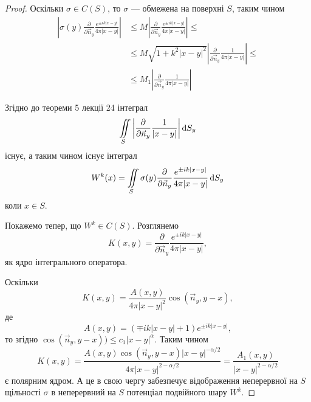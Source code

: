 \begin{proof}
	Оскільки $\sigma \in C(S)$, то $\sigma$ --- обмежена на поверхні $S$, таким чином
	\begin{equation}
		\begin{aligned}
			\left| \sigma(y) \frac{\partial}{\partial \vec n_y} \frac{e^{\pm i k |x - y|}}{4 \pi |x - y|} \right| &\le M \left| \frac{\partial}{\partial \vec n_y} \frac{e^{\pm i k |x - y|}}{4 \pi |x - y|} \right| \le \\
			&\le M \sqrt{1 + k^2 |x - y|^2} \left| \frac{\partial}{\partial \vec n_y} \frac{1}{4 \pi |x - y|} \right| \le \\
			&\le M_1 \left| \frac{\partial}{\partial \vec n_y} \frac{1}{4 \pi |x - y|} \right|
		\end{aligned}
	\end{equation}

	Згідно до теореми 5 лекції 24 інтеграл
	\begin{equation}
		\displaystyle\iint\limits_S \left| \frac{\partial}{\partial \vec n_y} \frac{1}{|x - y|} \right| \mathop{}\!\mathrm{d} S_y
	\end{equation}
	існує, а таким чином існує інтеграл
	\begin{equation}
		W^k(x) = \displaystyle\iint\limits_S \sigma(y) \frac{\partial}{\partial \vec n_y} \frac{e^{\pm i k |x - y|}}{4 \pi |x - y|} \mathop{}\!\mathrm{d} S_y
	\end{equation}
	коли $x \in S$. \medskip

	Покажемо тепер, що $W^k \in C(S)$. Розглянемо
	\begin{equation}
		K(x, y) = \frac{\partial}{\partial \vec n_y} \frac{e^{\pm i k |x - y|}}{4 \pi |x - y|},
	\end{equation}
	як ядро інтегрального оператора. \medskip
	
	Оскільки
	\begin{equation}
		K(x, y) = \frac{A(x, y)}{4 \pi |x - y|^2} \cos(\vec n_y, y - x),
	\end{equation}
	де
	\begin{equation}
		A(x, y) = (\mp i k |x - y| + 1) e^{\pm i k |x - y|},
	\end{equation}
	то згідно  $\cos(\vec n_y, y - x)) \le c_1 |x - y|^\alpha$. Таким чином
	\begin{equation}
		K(x, y) = \frac{A(x, y) \cos(\vec n_y, y - x) |x - y|^{-\alpha/2}}{4 \pi |x - y|^{2-\alpha/2}} = \frac{A_1(x, y)}{|x - y|^{2-\alpha/2}}
	\end{equation}
	є полярним ядром. А це в свою чергу забезпечує відображення неперервної на $S$ щільності $\sigma$ в неперервний на $S$ потенціал подвійного шару $W^k$.
\end{proof}

